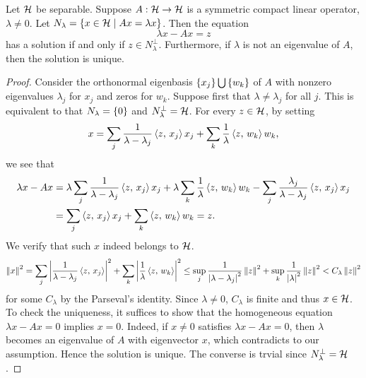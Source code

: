 \begin{theorem}
    Let $\mathcal{H}$ be separable. Suppose $A:\mathcal{H}\to\mathcal{H}$ is a symmetric compact 
    linear operator, $\lambda\neq 0$. Let $N_\lambda = \left\{ x\in\mathcal{H} \;\middle\vert\; Ax = \lambda x \right\}$. 
    Then the equation 
    \begin{equation*}
        \lambda x - Ax = z
    \end{equation*}
    has a solution if and only if $z\in N_\lambda^\perp$. Furthermore, if 
    $\lambda$ is not an eigenvalue of $A$, then the solution is unique.
\end{theorem}
\begin{proof}
    Consider the orthonormal eigenbasis $\left\{ {x_j} \right\}\bigcup\left\{ {w_k} \right\}$ of $A$ with nonzero 
    eigenvalues $\lambda_j$ for $x_j$ and zeros for $w_k$. Suppose first that 
    $\lambda\neq\lambda_j$ for all $j$. This is equivalent to that $N_\lambda = \left\{ {0} \right\}$ and 
    $N_\lambda^\perp = \mathcal{H}$. For every $z\in\mathcal{H}$, by setting 
    \begin{equation*}
        x = \sum_j\frac{1}{\lambda-\lambda_j}\left\langle {z},\, {x_j} \right\rangle x_j + \sum_k\frac{1}{\lambda}\left\langle {z},\, {w_k} \right\rangle w_k,
    \end{equation*} 
    we see that 
    \begin{equation*}
        \begin{split}
            \lambda x - Ax 
            &= \lambda\sum_j\frac{1}{\lambda-\lambda_j}\left\langle {z},\, {x_j} \right\rangle x_j + \lambda\sum_k\frac{1}{\lambda}\left\langle {z},\, {w_k} \right\rangle w_k - \sum_j\frac{\lambda_j}{\lambda-\lambda_j}\left\langle {z},\, {x_j} \right\rangle x_j \\
            &= \sum_j\left\langle {z},\, {x_j} \right\rangle x_j + \sum_k\left\langle {z},\, {w_k} \right\rangle w_k = z.
        \end{split}
    \end{equation*}
    We verify that such $x$ indeed belongs to $\mathcal{H}$. 
    \begin{equation*}
        \left\lVert {x} \right\rVert^2 = \sum_j\left\lvert {\frac{1}{\lambda-\lambda_j}\left\langle {z},\, {x_j} \right\rangle} \right\rvert^2 + \sum_k\left\lvert {\frac{1}{\lambda}\left\langle {z},\, {w_k} \right\rangle} \right\rvert^2 
        \leq \sup_j\frac{1}{\left\lvert {\lambda-\lambda_j} \right\rvert^2}\left\lVert {z} \right\rVert^2 + \sup_k\frac{1}{\left\lvert {\lambda} \right\rvert^2}\left\lVert {z} \right\rVert^2 < C_\lambda\left\lVert {z} \right\rVert^2
    \end{equation*}
    for some $C_\lambda$ by the Parseval's identity. Since $\lambda\neq 0$, $C_\lambda$ is 
    finite and thus $x\in\mathcal{H}$. To check the uniqueness, it suffices to show that the 
    homogeneous equation $\lambda x - Ax = 0$ implies $x = 0$. Indeed, if $x\neq 0$ satisfies 
    $\lambda x - Ax = 0$, then $\lambda$ becomes an eigenvalue of $A$ with eigenvector $x$, 
    which contradicts to our assumption. Hence the solution is unique. The converse is trvial 
    since $N_\lambda^\perp = \mathcal{H}$.


\end{proof}
